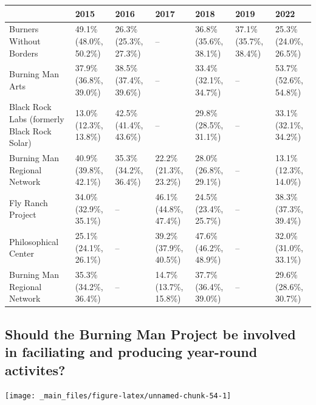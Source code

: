 \documentclass[
]{book}
\begin{document}
\begin{table}
\centering
\begin{tabular}[t]{>{}l|>{}l|>{}l|>{}l|>{}l|>{}l|>{}l}
\hline
  & 2015 & 2016 & 2017 & 2018 & 2019 & 2022\\
\hline
Burners Without Borders & 49.1\% (48.0\%, 50.2\%) & 26.3\% (25.3\%, 27.3\%) & -- & 36.8\% (35.6\%, 38.1\%) & 37.1\% (35.7\%, 38.4\%) & 25.3\% (24.0\%, 26.5\%)\\
\hline
Burning Man Arts & 37.9\% (36.8\%, 39.0\%) & 38.5\% (37.4\%, 39.6\%) & -- & 33.4\% (32.1\%, 34.7\%) & -- & 53.7\% (52.6\%, 54.8\%)\\
\hline
Black Rock Labs (formerly 
 Black Rock Solar) & 13.0\% (12.3\%, 13.8\%) & 42.5\% (41.4\%, 43.6\%) & -- & 29.8\% (28.5\%, 31.1\%) & -- & 33.1\% (32.1\%, 34.2\%)\\
\hline
Burning Man Regional Network & 40.9\% (39.8\%, 42.1\%) & 35.3\% (34.2\%, 36.4\%) & 22.2\% (21.3\%, 23.2\%) & 28.0\% (26.8\%, 29.1\%) & -- & 13.1\% (12.3\%, 14.0\%)\\
\hline
Fly Ranch Project & 34.0\% (32.9\%, 35.1\%) & -- & 46.1\% (44.8\%, 47.4\%) & 24.5\% (23.4\%, 25.7\%) & -- & 38.3\% (37.3\%, 39.4\%)\\
\hline
Philosophical Center & 25.1\% (24.1\%, 26.1\%) & -- & 39.2\% (37.9\%, 40.5\%) & 47.6\% (46.2\%, 48.9\%) & -- & 32.0\% (31.0\%, 33.1\%)\\
\hline
Burning Man Regional 
 Network & 35.3\% (34.2\%, 36.4\%) & -- & 14.7\% (13.7\%, 15.8\%) & 37.7\% (36.4\%, 39.0\%) & -- & 29.6\% (28.6\%, 30.7\%)\\
\hline
\end{tabular}
\end{table}

\hypertarget{should-the-burning-man-project-be-involved-in-faciliating-and-producing-year-round-activites}{%
\subsection{Should the Burning Man Project be involved in faciliating and producing year-round activites?}\label{should-the-burning-man-project-be-involved-in-faciliating-and-producing-year-round-activites}}

\texttt{[image: \_main\_files/figure-latex/unnamed-chunk-54-1]}
\end{document}
